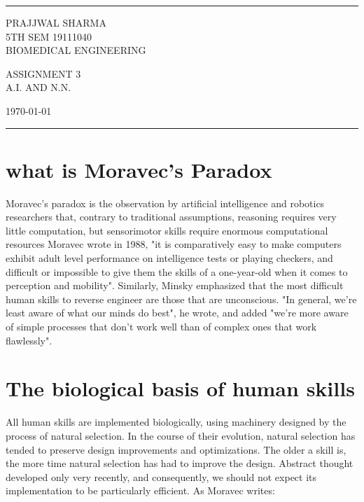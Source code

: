 \documentclass[a4paper]{article}
\begin{document}

\fancyhead[C]{}
\hrule \medskip %
\begin{minipage}{0.295\textwidth} 
\raggedright
\footnotesize
PRAJJWAL SHARMA \hfill\\   
5TH SEM 19111040\hfill\\
BIOMEDICAL ENGINEERING
\end{minipage}
\begin{minipage}{0.4\textwidth} 
\centering 
\large 
ASSIGNMENT 3\\ 
\normalsize 
A.I. AND N.N.\\ 
\end{minipage}
\begin{minipage}{0.295\textwidth} 
\raggedleft
\today\hfill\\
\end{minipage}
\medskip\hrule 
\bigskip


\section{what is Moravec's Paradox }
Moravec's paradox is the observation by artificial intelligence and robotics researchers that, contrary to traditional assumptions, reasoning requires very little computation, but sensorimotor skills require enormous computational resources
 Moravec wrote in 1988, "it is comparatively easy to make computers exhibit adult level performance on intelligence tests or playing checkers, and difficult or impossible to give them the skills of a one-year-old when it comes to perception and mobility".
 Similarly, Minsky emphasized that the most difficult human skills to reverse engineer are those that are unconscious. "In general, we're least aware of what our minds do best", he wrote, and added "we're more aware of simple processes that don't work well than of complex ones that work flawlessly".



\section{The biological basis of human skills}
All human skills are implemented biologically, using machinery designed by the process of natural selection. In the course of their evolution, natural selection has tended to preserve design improvements and optimizations. The older a skill is, the more time natural selection has had to improve the design. Abstract thought developed only very recently, and consequently, we should not expect its implementation to be particularly efficient.
As Moravec writes:
\end{document}
